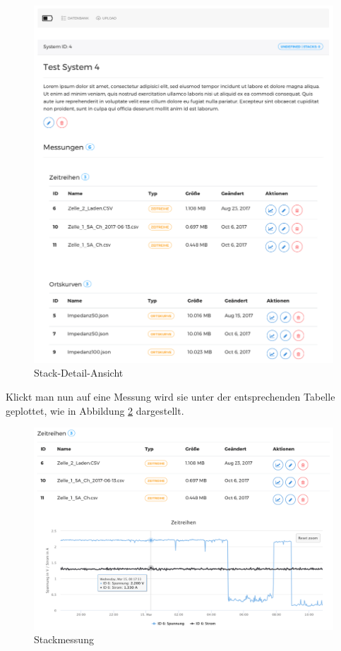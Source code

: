 \begin{figure}
\centering
\includegraphics[width=\textwidth]{Figures/stack}
\caption{Stack-Detail-Ansicht}
\label{fig:stack}
\end{figure}

Klickt man nun auf eine Messung wird sie unter der entsprechenden Tabelle geplottet, wie in Abbildung \ref{fig:stackmessung} dargestellt.

\begin{figure}
\centering
\includegraphics[width=\textwidth]{Figures/stackmessung}
\caption{Stackmessung}
\label{fig:stackmessung}
\end{figure}


